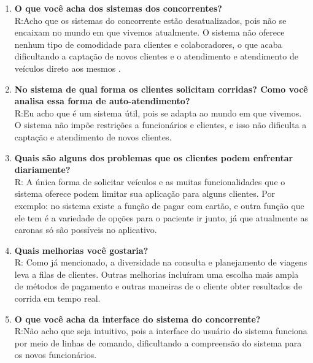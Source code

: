 \begin{enumerate}
      \item \textbf{O que você acha dos sistemas dos concorrentes?}
            \\R:Acho que os sistemas do concorrente estão desatualizados, pois não se encaixam no mundo em que vivemos atualmente. O sistema não oferece nenhum tipo de comodidade para clientes e colaboradores, o que acaba dificultando a captação de novos clientes e o atendimento e atendimento de veículos direto aos mesmos .\\

      \item \textbf{No sistema de qual forma os clientes solicitam corridas? Como você analisa essa forma de auto-atendimento?}
            \\R:Eu acho que é um sistema útil, pois se adapta ao mundo em que vivemos. O sistema não impõe restrições a funcionários e clientes, e isso não dificulta a captação e atendimento de novos clientes. \\

      \item \textbf{Quais são alguns dos problemas que os clientes podem enfrentar diariamente?}
            \\R: A única forma de solicitar veículos e as muitas funcionalidades que o sistema oferece podem limitar sua aplicação para alguns clientes. Por exemplo: no sistema existe a função de pagar com cartão, e outra função que ele tem é a variedade de opções para o paciente ir junto, já que atualmente as caronas só são possíveis no aplicativo. \\

      \item \textbf{Quais melhorias você gostaria?}
            \\R: Como já mencionado, a diversidade na consulta e planejamento de viagens leva a filas de clientes. Outras melhorias incluíram uma escolha mais ampla de métodos de pagamento e outras maneiras de o cliente obter resultados de corrida em tempo real.\\

      \item \textbf{O que você acha da interface do sistema do concorrente?}
            \\R:Não acho que seja intuitivo, pois a interface do usuário do sistema funciona por meio de linhas de comando, dificultando a compreensão do sistema para os novos funcionários. \\


\end{enumerate}
